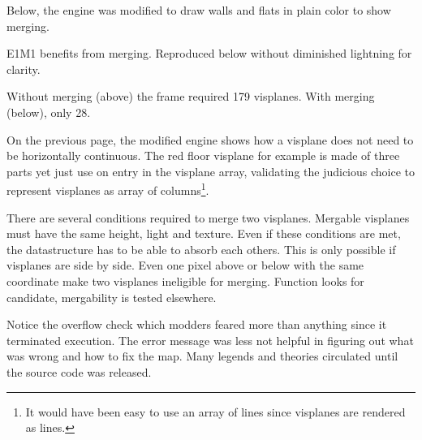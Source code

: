 

Below, the engine was modified to draw walls and flats in plain color to show merging.

\vspace{2mm}




 \label{complex_scene_plain_light.png}



E1M1 benefits from merging. Reproduced below without diminished lightning for clarity.

\vspace{2mm}





Without merging (above) the frame required 179 visplanes. With merging (below), only 28.

\vspace{2mm}


On the previous page, the modified engine shows how a visplane does not need to be horizontally continuous. The red floor visplane for example is made of three parts yet just use on entry in the visplane array, validating the judicious choice to represent visplanes as array of columns\footnote{It would have been easy to use an array of lines since visplanes are rendered as lines.}.\\
\par
There are several conditions required to merge two visplanes. Mergable visplanes must have the same height, light and texture. Even if these conditions are met, the datastructure has to be able to absorb each others. This is only possible if visplanes are side by side. Even one pixel above or below with the same  coordinate make two visplanes ineligible for merging. Function  looks for candidate, mergability is tested elsewhere.\\
\par
{}
\par
Notice the overflow check which modders feared more than anything since it terminated execution. The error message was less not helpful in figuring out what was wrong and how to fix the map. Many legends and theories circulated until the source code was released. 





